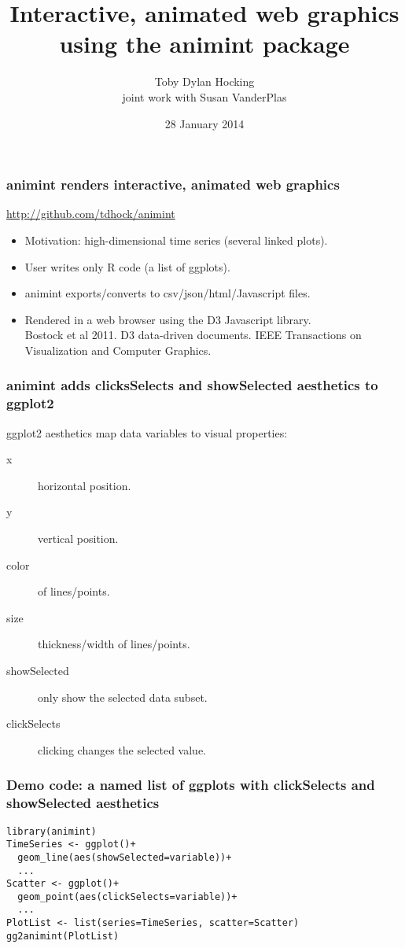 \documentclass{beamer}
\begin{document}
\title{Interactive, animated web graphics using the animint package}
\author{
Toby Dylan Hocking\\
joint work with Susan VanderPlas
}

\date{28 January 2014}

\maketitle

\begin{frame}
  \frametitle{animint renders interactive, animated web graphics}
  \url{http://github.com/tdhock/animint}
  \begin{itemize}
  \item Motivation: high-dimensional time series (several linked plots).
  \item User writes only R code (a list of ggplots).
  \item animint exports/converts to csv/json/html/Javascript files.
  \item Rendered in a web browser using the D3 Javascript library.\\
    Bostock et al 2011. D3 data-driven documents. IEEE Transactions on
    Visualization and Computer Graphics.
  \end{itemize}
\end{frame}

\begin{frame}
  \frametitle{animint adds clicksSelects and showSelected aesthetics
    to ggplot2}
  ggplot2 aesthetics map data variables to visual properties:
  \begin{description}
  \item[x] horizontal position.
  \item[y] vertical position.
  \item[color] of lines/points.
  \item[size] thickness/width of lines/points.
  \item[showSelected] only show the selected data subset.
  \item[clickSelects] clicking changes the selected value.
  \end{description}
\end{frame}

\begin{frame}[fragile]
  \frametitle{Demo code: a named list of ggplots with clickSelects and
    showSelected aesthetics}
\begin{verbatim}
library(animint)
TimeSeries <- ggplot()+
  geom_line(aes(showSelected=variable))+
  ...
Scatter <- ggplot()+
  geom_point(aes(clickSelects=variable))+
  ...
PlotList <- list(series=TimeSeries, scatter=Scatter)
gg2animint(PlotList)
\end{verbatim}
\end{frame}
\end{document}
